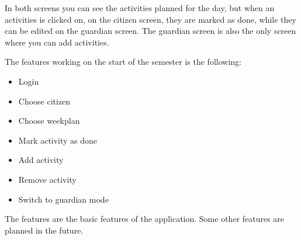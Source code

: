 In both screens you can see the activities planned for the day, but when an activities is clicked on, on the citizen screen, they are marked as done, while they can be edited on the guardian screen. The guardian screen is also the only screen where you can add activities.

The features working on the start of the semester is the following:
\begin{itemize}
    \item Login 
    \item Choose citizen 
    \item Choose weekplan
    \item Mark activity as done 
    \item Add activity
    \item Remove activity
    \item Switch to guardian mode
\end{itemize}

The features are the basic features of the application. Some other features are planned in the future. 